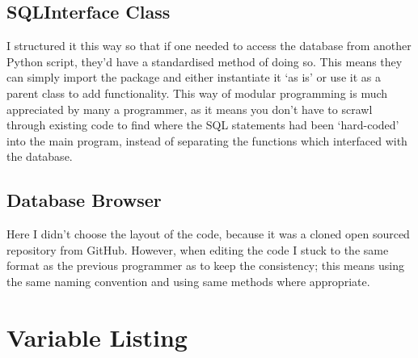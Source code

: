 \documentclass[12pt,a4paper]{report}
\begin{document}
    \subsection{SQLInterface Class}
    I structured it this way so that if one needed to access the database from another Python script, they'd
    have a standardised method of doing so. This means they can simply import the package and either instantiate it `as is'
    or use it as a parent class to add functionality. This way of modular programming is much appreciated by many a programmer,
    as it means you don't have to scrawl through existing code to find where the SQL statements had been `hard-coded' into the
    main program, instead of separating the functions which interfaced with the database.

    \subsection{Database Browser}
    Here I didn't choose the layout of the code, because it was a cloned open sourced repository from GitHub.
    However, when editing the code I stuck to the same format as the previous programmer as to keep the consistency; this
    means using the same naming convention and using same methods where appropriate.

\section{Variable Listing}
\end{document}
